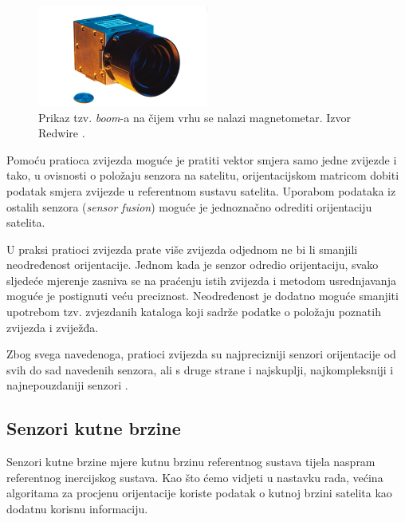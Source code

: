\documentclass[times, utf8, diplomski, numeric]{templates/template}
\begin{document}
{{{{                \begin{figure}[htb]
                \centering
                \includegraphics[width=0.5\textwidth]{images/star_tracker.png}
                \caption{Prikaz tzv. \emph{boom}-a na čijem vrhu se nalazi magnetometar. Izvor Redwire \cite{starTrackerCite}.}
                \label{fig:star_tracker}
                \end{figure}

                Pomoću pratioca zvijezda moguće je pratiti vektor smjera samo jedne zvijezde i tako, u ovisnosti o položaju senzora na satelitu, orijentacijskom matricom dobiti podatak smjera zvijezde u referentnom sustavu satelita. Uporabom podataka iz ostalih senzora (\emph{sensor fusion}) moguće je jednoznačno odrediti orijentaciju satelita. 

                U praksi pratioci zvijezda prate više zvijezda odjednom ne bi li smanjili neodređenost orijentacije. Jednom kada je senzor odredio orijentaciju, svako sljedeće mjerenje zasniva se na praćenju istih zvijezda i metodom usrednjavanja moguće je postignuti veću preciznost. Neodređenost je dodatno moguće smanjiti upotrebom tzv. zvjezdanih kataloga \cite{starCatalogs} koji sadrže podatke o položaju poznatih zvijezda i zviježđa.

                Zbog svega navedenoga, pratioci zvijezda su najprecizniji senzori orijentacije od svih do sad navedenih senzora, ali s druge strane i najskuplji, najkompleksniji i najnepouzdaniji senzori \cite{adcsKnjiga}. 
            }
        }

        \subsection{Senzori kutne brzine}{
        \label{subsection:senzori_kutne_brzine}
            Senzori kutne brzine mjere kutnu brzinu referentnog sustava tijela naspram referentnog inercijskog sustava. Kao što ćemo vidjeti u nastavku rada, većina algoritama za procjenu orijentacije koriste podatak o kutnoj brzini satelita kao dodatnu korisnu informaciju. 

}}}
\end{document}

